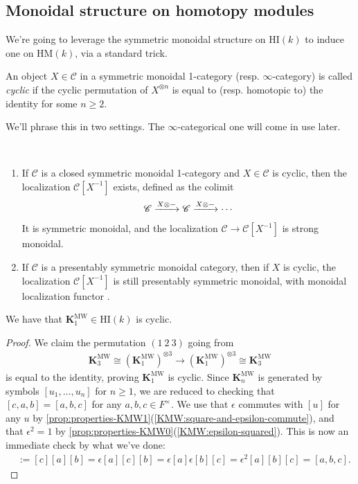 \documentclass[11pt,openany]{book}
\providecommand{\HI}{\mathrm{HI}}
\providecommand{\HM}{\mathrm{HM}}
\providecommand{\KMW}{\mathbf{K}^\mathrm{MW}}
\begin{document}
\subsection{Monoidal structure on homotopy modules}

We're going to leverage the symmetric monoidal structure on $\HI(k)$ to induce one on $\HM(k)$, via a standard trick.


\begin{definition} An object $X\in \mathscr{C}$ in a symmetric monoidal 1-category (resp. $\infty$-category) is called \textit{cyclic} if the cyclic permutation of $X^{\otimes n}$ is equal to (resp. homotopic to) the identity for some $n\ge 2$.
\end{definition}

We'll phrase this in two settings. The $\infty$-categorical one will come in use later.

\begin{theorem}\label{thm:cyclic-objects-localization}  $\ $
\begin{enumerate}
    \item If $\mathscr{C}$ is a closed symmetric monoidal 1-category and $X \in \mathscr{C}$ is cyclic, then the localization $\mathscr{C}[X^{-1}]$ exists, defined as the colimit
    \begin{align*}
        \mathscr{C} \xrightarrow{X \otimes -} \mathscr{C} \xrightarrow{X \otimes-} \cdots 
    \end{align*}
    It is symmetric monoidal, and the localization $\mathscr{C} \to \mathscr{C}[X^{-1}]$ is strong monoidal.
    \item If $\mathscr{C}$ is a presentably symmetric monoidal category, then if $X$ is cyclic, the localization $\mathscr{C}[X^{-1}]$ is still presentably symmetric monoidal, with monoidal localization functor \cite[\S2]{Robalo}.
\end{enumerate}

\end{theorem}


\begin{proposition}\label{prop:KMW1-cyclic} 
We have that $\KMW_1 \in \HI(k)$ is cyclic.
\end{proposition}
\begin{proof} We claim the permutation $(1\ 2\ 3)$ going from
\begin{align*}
    \KMW_3 \cong (\KMW_1)^{\otimes3} \to (\KMW_1)^{\otimes 3} \cong \KMW_3
\end{align*}
is equal to the identity, proving $\KMW_1$ is cyclic. Since $\KMW_n$ is generated by symbols $[u_1, \ldots, u_n]$ for $n\ge 1$, we are reduced to checking that $[c,a,b] = [a,b,c]$ for any $a,b,c \in F^\times$. We use that $\epsilon$ commutes with $[u]$ for any $u$ by \autoref{prop:properties-KMW1}(\ref{KMW:square-and-epsilon-commute}), and that $\epsilon^2 = 1$ by \autoref{prop:properties-KMW0}(\ref{KMW:epsilon-squared}). This is now an immediate check by what we've done:
\begin{align*}
    [c,a,b] &:=[c][a][b] = \epsilon[a][c][b] = \epsilon[a]\epsilon[b][c] = \epsilon^2[a][b][c] = [a,b,c].
\end{align*}
\end{proof}
\end{document}
